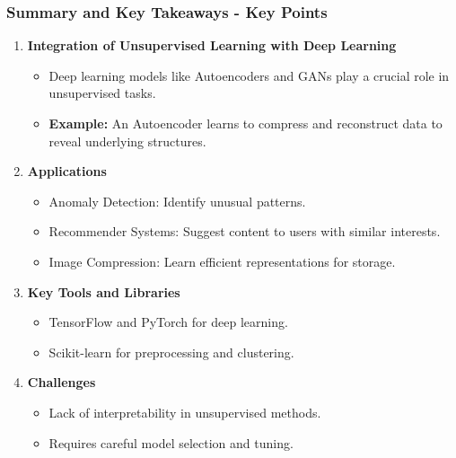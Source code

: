 \documentclass[aspectratio=169]{beamer}
\begin{document}
\begin{frame}[fragile]
    \frametitle{Summary and Key Takeaways - Key Points}
    \begin{enumerate}
        \item \textbf{Integration of Unsupervised Learning with Deep Learning}
            \begin{itemize}
                \item Deep learning models like Autoencoders and GANs play a crucial role in unsupervised tasks.
                \item \textbf{Example:} An Autoencoder learns to compress and reconstruct data to reveal underlying structures.
            \end{itemize}
        \item \textbf{Applications}
            \begin{itemize}
                \item Anomaly Detection: Identify unusual patterns.
                \item Recommender Systems: Suggest content to users with similar interests.
                \item Image Compression: Learn efficient representations for storage.
            \end{itemize}
        \item \textbf{Key Tools and Libraries}
            \begin{itemize}
                \item TensorFlow and PyTorch for deep learning.
                \item Scikit-learn for preprocessing and clustering.
            \end{itemize}
        \item \textbf{Challenges}
            \begin{itemize}
                \item Lack of interpretability in unsupervised methods.
                \item Requires careful model selection and tuning.
            \end{itemize}
    \end{enumerate}
\end{frame}
\end{document}
